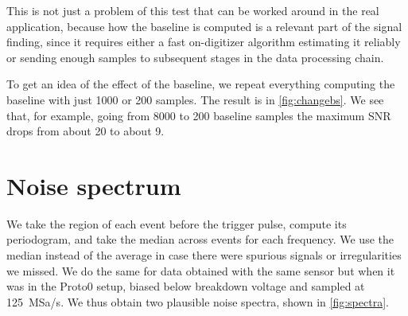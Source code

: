 This is not just a problem of this test that can be worked around in the real
application, because how the baseline is computed is a relevant part of the
signal finding, since it requires either a fast on-digitizer algorithm
estimating it reliably or sending enough samples to subsequent stages in the
data processing chain.

To get an idea of the effect of the baseline, we repeat everything computing
the baseline with just 1000 or 200 samples. The result is in
\autoref{fig:changebs}. We see that, for example, going from 8000 to 200
baseline samples the maximum SNR drops from about 20 to about 9.



\begin{figure}
    

\end{figure}

\section{Noise spectrum}
\label{sec:spectrum}

We take the region of each event before the trigger pulse, compute its
periodogram, and take the median across events for each frequency. We use the
median instead of the average in case there were spurious signals or
irregularities we missed. We do the same for data obtained with the same sensor
but when it was in the Proto0 setup, biased below breakdown voltage and sampled
at \SI{125}{MSa/s}. We thus obtain two plausible noise spectra, shown in
\autoref{fig:spectra}.

